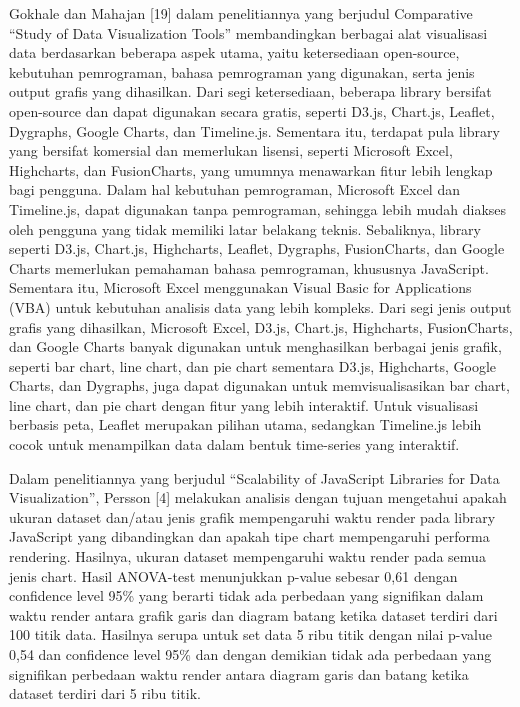 Gokhale dan Mahajan [19] dalam penelitiannya yang berjudul Comparative “Study of Data Visualization Tools” membandingkan berbagai alat visualisasi data berdasarkan beberapa aspek utama, yaitu ketersediaan open-source, kebutuhan pemrograman, bahasa pemrograman yang digunakan, serta jenis output grafis yang dihasilkan. Dari segi ketersediaan, beberapa library bersifat open-source dan dapat digunakan secara gratis, seperti D3.js, Chart.js, Leaflet, Dygraphs, Google Charts, dan Timeline.js. Sementara itu, terdapat pula library yang bersifat komersial dan memerlukan lisensi, seperti Microsoft Excel, Highcharts, dan FusionCharts, yang umumnya menawarkan fitur lebih lengkap bagi pengguna. Dalam hal kebutuhan pemrograman, Microsoft Excel dan Timeline.js, dapat digunakan tanpa pemrograman, sehingga lebih mudah diakses oleh pengguna yang tidak memiliki latar belakang teknis. Sebaliknya, library seperti D3.js, Chart.js, Highcharts, Leaflet, Dygraphs, FusionCharts, dan Google Charts memerlukan pemahaman bahasa pemrograman, khususnya JavaScript. Sementara itu, Microsoft Excel menggunakan Visual Basic for Applications (VBA) untuk kebutuhan analisis data yang lebih kompleks. Dari segi jenis output grafis yang dihasilkan, Microsoft Excel, D3.js, Chart.js, Highcharts, FusionCharts, dan Google Charts banyak digunakan untuk menghasilkan berbagai jenis grafik, seperti bar chart, line chart, dan pie chart sementara D3.js, Highcharts, Google Charts, dan Dygraphs, juga dapat digunakan untuk memvisualisasikan bar chart, line chart, dan pie chart dengan fitur yang lebih interaktif. Untuk visualisasi berbasis peta, Leaflet merupakan pilihan utama, sedangkan Timeline.js lebih cocok untuk menampilkan data dalam bentuk time-series yang interaktif.

Dalam penelitiannya yang berjudul “Scalability of JavaScript Libraries for Data Visualization”, Persson [4] melakukan analisis dengan tujuan mengetahui apakah ukuran dataset dan/atau jenis grafik mempengaruhi waktu render pada library JavaScript yang dibandingkan dan apakah tipe chart mempengaruhi performa rendering. Hasilnya, ukuran dataset mempengaruhi waktu render pada semua jenis chart. Hasil ANOVA-test menunjukkan p-value sebesar 0,61 dengan confidence level 95\% yang berarti tidak ada perbedaan yang signifikan dalam waktu render antara grafik garis dan diagram batang ketika dataset terdiri dari 100 titik data. Hasilnya serupa untuk set data 5 ribu titik dengan nilai p-value 0,54 dan confidence level 95\% dan dengan demikian tidak ada perbedaan yang signifikan perbedaan waktu render antara diagram garis dan batang ketika dataset terdiri dari 5 ribu titik.

